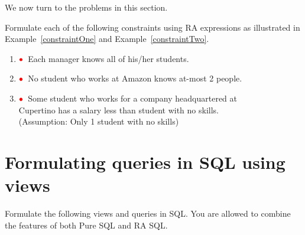 \documentclass[11pt]{article}
\newcommand{\red}[1]{{\color{red}#1}}
\newcommand{\redbullet}{$\red{\bullet}$}
\begin{document}
We now turn to the problems in this section.

Formulate each of the following constraints using RA expressions as illustrated in Example~\ref{constraintOne} and
Example~\ref{constraintTwo}.

\begin{enumerate}[resume]


\item \redbullet\ Each manager knows all of his/her students. 

\item \redbullet\ No student who works at Amazon knows at-most 2 people. 

\item \redbullet\ Some student who works for a company headquartered at   \\ Cupertino has a salary less than student with no skills.  \\(Assumption: Only 1 student with no skills) 

\end{enumerate}




\newpage

\section{Formulating queries in SQL using views}


Formulate the following views and queries in SQL. You are allowed to combine the features of both Pure SQL and RA SQL.
\end{document}
